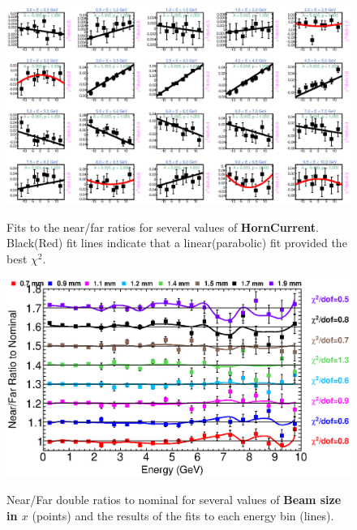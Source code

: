 \begin{figure}[ht]
  \begin{center}
    {\includegraphics[width=5.0in]{figures/HornCurrent_nof_fits.eps}}
  \end{center}
\caption{ Fits to the near/far ratios for several values of {\bf HornCurrent}. Black(Red) fit lines indicate that a linear(parabolic) fit provided the best $\chi^2$. }
\end{figure}

\begin{figure}[ht]
  \begin{center}
    {\includegraphics[width=6.0in]{figures/BeamSigmaX_nof_summary.eps}}
  \end{center}
\caption{ Near/Far double ratios to nominal for several values of {\bf Beam size in $x$} (points) and the results of the fits to each energy bin (lines).}
\end{figure}

